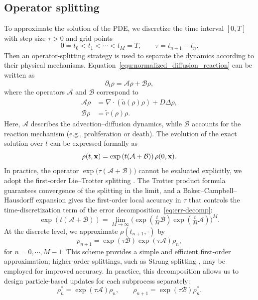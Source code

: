 \documentclass[a4paper,fleqn]{cas-sc}
\theoremstyle{definition}
\theoremstyle{remark}
\begin{document}
\subsection{Operator splitting}
\label{sec:splitting}
To approximate the solution of the PDE, we discretize the time interval $[0,T]$ with step size $\tau>0$ and grid points
\[
0 = t_0 < t_1 < \cdots < t_M = T,\qquad \tau=t_{n+1}-t_n.
\]
Then an operator-splitting strategy is used to separate the dynamics according to their physical mechanisms. 
Equation~\eqref{equ:normalized_diffusion_reaction} can be written as
\begin{equation}
\partial_t \rho = \mathcal{A}\rho + \mathcal{B}\rho ,
\end{equation}
where the operators $\mathcal{A}$ and $\mathcal{B}$ correspond to
\begin{align}
\mathcal{A}\rho &= \nabla \cdot \left( \tilde a(\rho)\rho \right) + D\Delta\rho  , \\
\mathcal{B}\rho &= \tilde r(\rho)\rho .
\end{align}
Here, $\mathcal{A}$ describes the advection--diffusion dynamics, while $\mathcal{B}$ accounts for the reaction mechanism (e.g., proliferation or death).  The evolution of the exact solution over $t$ can be expressed formally as
\begin{equation}
\rho(t,\mathbf{x}) = \exp\left( t (\mathcal{A} + \mathcal{B}) \right)\rho(0,\mathbf{x}).
\end{equation}
In practice, the operator $\exp\!\big(\tau(\mathcal{A}+\mathcal{B})\big)$ cannot be evaluated explicitly, 
we adopt the first-order Lie--Trotter splitting \cite{trotter1959product}. The Trotter product formula guarantees
convergence of the splitting in the limit, and a Baker--Campbell--Hausdorff expansion gives the first-order local
accuracy in $\tau$ that controls the time-discretization term of the error decomposition~\eqref{eq:err-decomp}:
\begin{equation}
\exp\!\left( t (\mathcal{A} + \mathcal{B}) \right) 
= \lim_{M\to\infty} \Big( \exp\!\left(\tfrac{t}{M} \mathcal{B}\right) 
                          \exp\!\left(\tfrac{t}{M} \mathcal{A}\right) \Big)^M .
\end{equation}
At the discrete level, we approximate $\rho(t_{n+1},\cdot)$ by
\begin{equation}
\rho_{n+1} = \exp(\tau \mathcal{B}) \exp(\tau \mathcal{A}) \rho_n ,
\end{equation}
for $n=0,\cdots,M-1$.
This scheme provides a simple and efficient first-order approximation; 
higher-order splittings, such as Strang splitting \cite{strang1968construction}, may be employed for improved accuracy.
In practice, this decomposition allows us to design particle-based updates for each subprocess separately:
\begin{equation}
\rho_n^\ast = \exp(\tau \mathcal{A})\rho_n, 
\qquad 
\rho_{n+1} = \exp(\tau \mathcal{B})\rho_n^\ast.
\end{equation}
\end{document}
